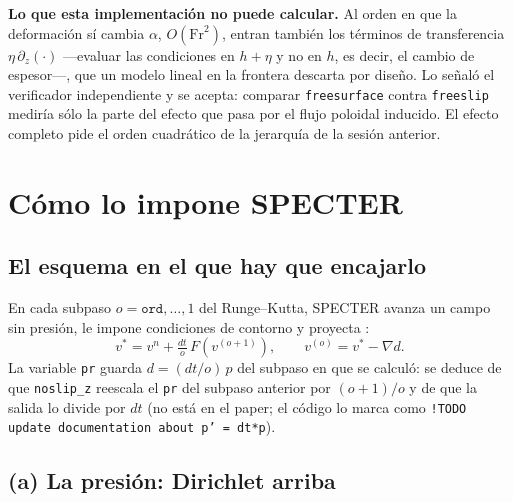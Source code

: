 \documentclass[11pt,a4paper]{article}
\begin{document}
\textbf{Lo que esta implementación no puede calcular.} Al orden en que la deformación sí
cambia $\alpha$, $O(\mathrm{Fr}^2)$, entran también los términos de transferencia
$\eta\,\partial_z(\cdot)$ ---evaluar las condiciones en $h+\eta$ y no en $h$, es decir, el
cambio de espesor---, que un modelo lineal en la frontera descarta por diseño. Lo señaló el
verificador independiente y se acepta: comparar \texttt{freesurface} contra \texttt{freeslip}
mediría sólo la parte del efecto que pasa por el flujo poloidal inducido. El efecto completo
pide el orden cuadrático de la jerarquía de la sesión anterior.

\section{Cómo lo impone SPECTER}

\subsection{El esquema en el que hay que encajarlo}

En cada subpaso $o=\texttt{ord},\dots,1$ del Runge--Kutta, SPECTER avanza un campo sin
presión, le impone condiciones de contorno y proyecta \cite{fontana2020}:
\[
v^*=v^n+\tfrac{dt}{o}\,F(v^{(o+1)}),\qquad v^{(o)}=v^*-\nabla d .
\]
La variable \texttt{pr} guarda $d=(dt/o)\,p$ del subpaso en que se calculó: se deduce de
que \texttt{noslip\_z} reescala el \texttt{pr} del subpaso anterior por $(o+1)/o$ y de que
la salida lo divide por $dt$ (no está en el paper; el código lo marca como
\texttt{!TODO update documentation about p' = dt*p}).

\subsection{(a) La presión: Dirichlet arriba}
\end{document}
